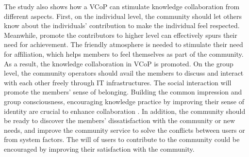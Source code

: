 \documentclass[doublespacing]{elsarticle}
\begin{document}
The study also shows how a VCoP can  stimulate knowledge collaboration
from different aspects.
 First, on the individual level, the community should let others know
 about the individuals' contribution to make the individual feel
 respected. Meanwhile,  promote the contributors to higher level can
 effectively spurs their need for achievement. The friendly atmosphere
 is needed to stimulate their need for affiliation, which helps
 members to feel themselves as part of the community. As a result, the
 knowledge collaboration in VCoP is promoted. On the group level, the
 community operators should avail the members to discuss and interact
 with each other freely through IT infrastructures. The social
 interaction will promote the members' sense of belonging. Building
 the common impression and group consciousness, encouraging knowledge
 practice by improving their sense of identity are crucial to enhance
 collaboration . In addition, the community should be ready to
 discover the members' dissatisfaction with the community or new needs, and improve the community service to solve the conflicts between users or from system factors. The will of users to contribute to the community could be encouraged by improving their satisfaction with the community. 
\end{document}
